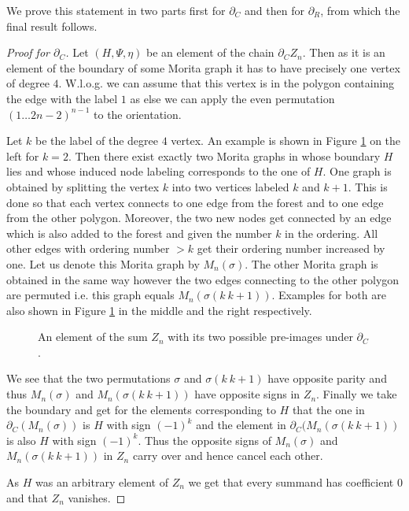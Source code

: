 We prove this statement in two parts first for $\partial_{C}$ and then for $\partial_{R}$, from which the final result follows.
\begin{proof}[Proof for $\partial_C$]
	Let $(H,\Psi,\eta)$ be an element of the chain $\partial_{C} Z_{n}$.
	Then as it is an element of the boundary of some Morita graph it has to
	have precisely one vertex of degree $4$. W.l.o.g. we can assume that this vertex is in the polygon containing the 
	edge with the label $1$ as else we can apply the even permutation $(1 \ldots 2n-2)^{n-1}$ to the orientation.

	Let $k$ be the label of the degree $4$ vertex. An example is shown in Figure \ref{fig:MoritaCycleDC} on the left for $k = 2$. 
	Then there exist exactly two Morita graphs in whose boundary $H$ lies and whose induced node labeling corresponds to the one of $H$.
	One graph is obtained by splitting the vertex $k$ into two vertices labeled $k$ and $k+1$.
	This is done so that each vertex connects to one edge from the forest and to one edge from the other polygon.
	Moreover, the two new nodes get connected by an edge which is also added to the forest and given the number $k$ in the ordering.
	All other edges with ordering number  $> k $ get their ordering number increased by one. Let us denote this Morita graph by $M_{n}(\sigma)$.
	The other Morita graph is obtained in the same way however the two edges connecting to the other polygon are permuted i.e.
	this graph equals $M_{n}(\sigma(k\ k+1))$.
	Examples for both are also shown in Figure \ref{fig:MoritaCycleDC} in the middle and the right respectively.

	\begin{figure}[hp]
		\centering
		\caption{An element of the sum $Z_{n}$ with its two possible pre-images under $\partial_{C}$.}
		\label{fig:MoritaCycleDC}
	\end{figure}
	We see that the two permutations $\sigma$ and $\sigma (k\ k+1)$ have opposite parity and thus $M_{n}(\sigma)$ and $M_{n}(\sigma (k\ k+1))$ have
	opposite signs in $Z_{n}$. Finally we take the boundary and get for the elements corresponding to $H$ that
	the one in $\partial_{C}(M_{n}(\sigma))$ is $H$ with sign $(-1)^{k}$ and the element in $\partial_{C}(M_{n}(\sigma (k\ k+1))$ is also $H$ with sign $(-1)^{k}$.
	Thus the opposite signs of $M_{n}(\sigma)$ and $M_{n}(\sigma (k\ k+1))$ in $Z_{n}$ carry over and hence cancel each other.

	As $H$ was an arbitrary element of $Z_{n}$ we get that every summand has coefficient $0$ and that $Z_{n}$ vanishes.
\end{proof}

